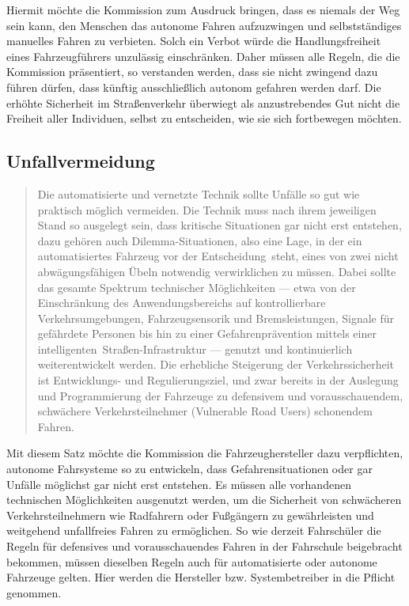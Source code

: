 \documentclass[twoside,a4paper,12pt]{article}
\begin{document}
Hiermit möchte die Kommission zum Ausdruck bringen, dass es niemals der Weg sein kann, den Menschen das autonome Fahren aufzuzwingen und selbstständiges
manuelles Fahren zu verbieten. Solch ein Verbot würde die Handlungsfreiheit eines Fahrzeugführers unzulässig einschränken. Daher müssen alle Regeln, die die
Kommission präsentiert, so verstanden werden, dass sie nicht zwingend dazu führen dürfen, dass künftig ausschließlich autonom gefahren werden darf. Die erhöhte Sicherheit im Straßenverkehr überwiegt als anzustrebendes Gut nicht die Freiheit aller Individuen, selbst zu entscheiden, wie sie sich fortbewegen möchten.\\

\subsection{Unfallvermeidung} \label{Unfallvermeidung}

\begin{quote}
\glqq
Die automatisierte und vernetzte Technik sollte Unfälle so gut wie praktisch möglich vermeiden. Die Technik muss nach 
ihrem jeweiligen Stand so ausgelegt sein, dass kritische
Situationen gar nicht erst entstehen, dazu gehören auch Dilemma-Situationen, also eine
Lage, in der ein automatisiertes Fahrzeug vor der \glqq Entscheidung\grqq\ steht, eines von zwei
nicht abwägungsfähigen Übeln notwendig verwirklichen zu müssen. Dabei sollte das gesamte Spektrum technischer 
Möglichkeiten --- etwa von der Einschränkung des Anwendungsbereichs auf kontrollierbare Verkehrsumgebungen, 
Fahrzeugsensorik und Bremsleistungen, Signale für gefährdete Personen bis hin zu einer Gefahrenprävention mittels
einer \glqq intelligenten\grqq\ Straßen-Infrastruktur --- genutzt und kontinuierlich weiterentwickelt
werden. Die erhebliche Steigerung der Verkehrssicherheit ist Entwicklungs- und Regulierungsziel, und zwar bereits in der 
Auslegung und Programmierung der Fahrzeuge zu defensivem und vorausschauendem, schwächere Verkehrsteilnehmer (\glqq Vulnerable Road
Users\grqq) schonendem Fahren.\grqq\mbox{~\cite[S. 10]{ek}}
\end{quote}

Mit diesem Satz möchte die Kommission die Fahrzeughersteller dazu verpflichten, autonome Fahrsysteme so zu entwickeln, dass Gefahrensituationen oder gar Unfälle
möglichst gar nicht erst entstehen. Es müssen alle vorhandenen technischen Möglichkeiten ausgenutzt werden, um die Sicherheit von schwächeren Verkehrsteilnehmern wie
Radfahrern oder Fußgängern zu gewährleisten und weitgehend unfallfreies Fahren zu ermöglichen. So wie derzeit Fahrschüler die Regeln für defensives und
vorausschauendes Fahren in der Fahrschule beigebracht bekommen, müssen dieselben Regeln auch für automatisierte oder autonome Fahrzeuge gelten. Hier werden die Hersteller bzw. Systembetreiber in die Pflicht genommen.\\ 
\end{document}
